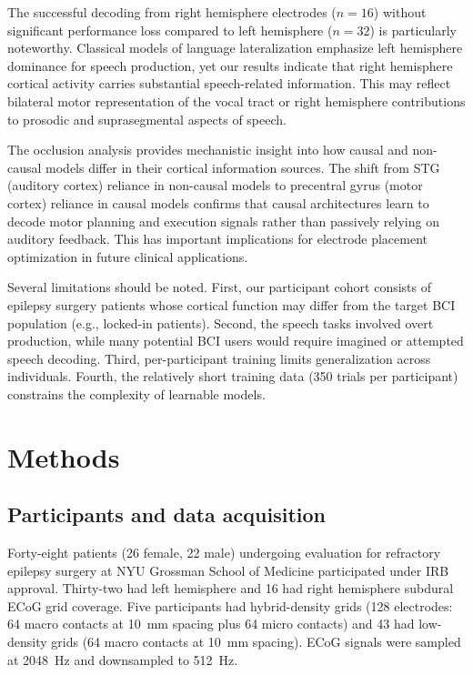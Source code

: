 \documentclass[11pt]{article}
\begin{document}
The successful decoding from right hemisphere electrodes ($n = 16$) without significant performance loss compared to left hemisphere ($n = 32$) is particularly noteworthy. Classical models of language lateralization \citep{hickok2007} emphasize left hemisphere dominance for speech production, yet our results indicate that right hemisphere cortical activity carries substantial speech-related information. This may reflect bilateral motor representation of the vocal tract \citep{bouchard2013} or right hemisphere contributions to prosodic and suprasegmental aspects of speech.

The occlusion analysis provides mechanistic insight into how causal and non-causal models differ in their cortical information sources. The shift from STG (auditory cortex) reliance in non-causal models to precentral gyrus (motor cortex) reliance in causal models confirms that causal architectures learn to decode motor planning and execution signals rather than passively relying on auditory feedback. This has important implications for electrode placement optimization in future clinical applications.

Several limitations should be noted. First, our participant cohort consists of epilepsy surgery patients whose cortical function may differ from the target BCI population (e.g., locked-in patients). Second, the speech tasks involved overt production, while many potential BCI users would require imagined or attempted speech decoding. Third, per-participant training limits generalization across individuals. Fourth, the relatively short training data (350 trials per participant) constrains the complexity of learnable models.

\section{Methods}

\subsection{Participants and data acquisition}

Forty-eight patients (26 female, 22 male) undergoing evaluation for refractory epilepsy surgery at NYU Grossman School of Medicine participated under IRB approval. Thirty-two had left hemisphere and 16 had right hemisphere subdural ECoG grid coverage. Five participants had hybrid-density grids (128 electrodes: 64 macro contacts at 10~mm spacing plus 64 micro contacts) and 43 had low-density grids (64 macro contacts at 10~mm spacing). ECoG signals were sampled at 2048~Hz and downsampled to 512~Hz.
\end{document}
